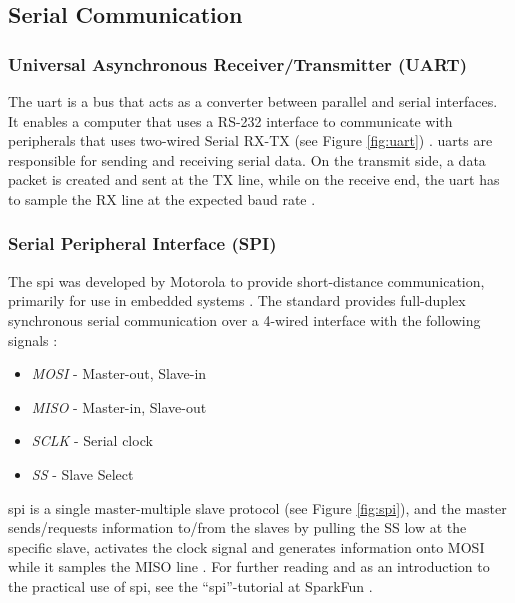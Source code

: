 \subsection{Serial Communication}
\subsubsection{Universal Asynchronous Receiver/Transmitter (UART)}
The \acrfull{uart} is a bus that acts as a converter between parallel and serial interfaces. It enables a computer that uses a RS-232 interface to communicate with peripherals that uses two-wired Serial RX-TX (see Figure \ref{fig:uart}) \cite{whatisuart}.
\acrshort{uart}s are responsible for sending and receiving serial data. On the transmit side, a data packet is created and sent at the TX line, while on the receive end, the \acrshort{uart} has to sample the RX line at the expected baud rate \cite{sparkfunuart}.

\subsubsection{Serial Peripheral Interface (SPI)}
The \acrfull{spi} was developed by Motorola to provide short-distance communication, primarily for use in embedded systems \cite{corelis2016}. The standard provides full-duplex synchronous serial communication over a 4-wired interface with the following signals \cite{epanorama2011}:
\begin{itemize}
	\item \textit{MOSI} - Master-out, Slave-in
	\item \textit{MISO} - Master-in, Slave-out
	\item \textit{SCLK} - Serial clock
	\item \textit{SS} - Slave Select
\end{itemize}
\acrshort{spi} is a single master-multiple slave protocol (see Figure \ref{fig:spi}), and the master sends/requests information to/from the slaves by pulling the SS low at the specific slave, activates the clock signal and generates information onto MOSI while it samples the MISO line \cite{byteparadigm}. For further reading and as an introduction to the practical use of \acrshort{spi}, see the ``\acrfull{spi}''-tutorial at SparkFun \cite{sparkfunspi}.